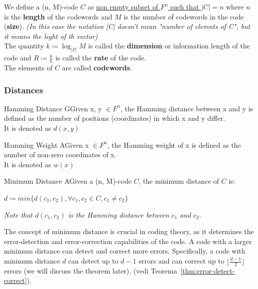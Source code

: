 \noindent
We define a (n, M)-code $C$ as  \underline{non empty subset of $F^n$ such that $|C| = n$} where $n$ is the \textbf{length} of the codewords and $M$ is the number of codewords in the code (\textbf{size}). \textit{(In this case the notation |C| doesn't mean "number of elemnts of C", but it means the leght of th vector)} \\
The quantity $k \coloneqq \log_{|F|} M$ is called the \textbf{dimension} or information length of the code and $R \coloneqq \frac{k}{n}$ is called the \textbf{rate} of the code.\\
The elements of $C$ are called \textbf{codewords}.

\subsubsection{Distances}

\begin{defBox}{Hamming Distance}
    GGiven x, y $\in F^n$, the Hamming distance between x and y is defined as the number of positions (coordinates) in which x and y differ.\\
    It is denoted as $d(x, y)$ 
\end{defBox}
\medskip

\begin{defBox}{Hamming Weight}
    AGiven x $\in F^n$, the Hamming weight of x is defined as the number of non-zero coordinates of x.\\
    It is denoted as $w(x)$
\end{defBox}
\medskip

\begin{defBox}{Minimum Distance}
    AGiven a (n, M)-code $C$, the minimum distance of $C$ is:
\begin{center}
    $d \coloneqq min\{d(c_1, c_2), \forall c_1, c_2 \in C, c_1 \neq c_2\}$
\end{center}
\noindent
\textit{Note that $d(c_1, c_2)$ is the Hamming distance between $c_1$ and $c_2$.}
\end{defBox}
\medskip

\noindent
The concept of minimum distance is crucial in coding theory, as it determines the error-detection and error-correction capabilities of the code. A code with a larger minimum distance can detect and correct more errors. Specifically, a code with minimum distance $d$ can detect up to $d-1$ errors and can correct up to $\lfloor \frac{d-1}{2} \rfloor$ errors (we will discuss the theorem later).
 (vedi Teorema~\ref{thm:error-detect-correct}).
\bigskip


